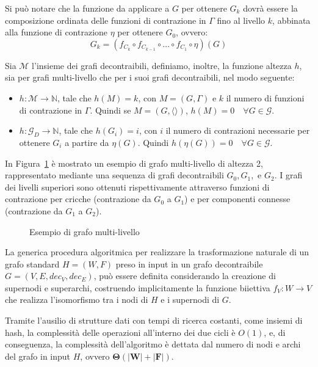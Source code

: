 Si pu\`o notare che la funzione da applicare a $G$ per ottenere $G_{k}$ dovr\`a essere la composizione ordinata
delle funzioni di contrazione in $\Gamma$ fino al livello $k$, abbinata alla funzione di contrazione $\eta$ per
ottenere $G_0$, ovvero:
\begin{equation*}
    G_k = (f_{C_k} \circ f_{C_{k-1}} \circ \ldots \circ f_{C_1} \circ \eta)(G)
\end{equation*}

Sia $\mathcal{M}$ l'insieme dei grafi decontraibili, definiamo, inoltre, la funzione altezza $h$, sia
per grafi multi-livello che per i suoi grafi decontraibili, nel modo seguente:

\begin{itemize}
    \item $h : \mathcal{M} \rightarrow \mathbb{N}$, tale che $h(M) = k$, con $M = (G, \Gamma)$ e $k$ il numero di
    funzioni di contrazione in $\Gamma$. Quindi se $M = (G, \langle \rangle)$, $h(M) = 0 \quad \forall G \in \mathcal{G}$.
    \item $h : \mathcal{G}_D \rightarrow \mathbb{N}$, tale che $h(G_i) = i$, con $i$ il numero di contrazioni
    necessarie per ottenere $G_i$ a partire da $\eta(G)$. Quindi $h(\eta(G)) = 0 \quad \forall G \in \mathcal{G}$.
\end{itemize}

In Figura~\ref{fig:multi-level-graph-example} \`e mostrato un esempio di grafo multi-livello di altezza 2,
rappresentato mediante una sequenza di grafi decontraibili $G_0, G_1,$ e $G_2$. I grafi dei livelli superiori
sono ottenuti rispettivamente attraverso funzioni di contrazione per cricche (contrazione da $G_0$ a $G_1$) e
per componenti connesse (contrazione da $G_1$ a $G_2$).

\begin{figure}
    
    \caption{Esempio di grafo multi-livello}
    \label{fig:multi-level-graph-example}
\end{figure}

\newpage

\label{subsec:algoritmo-di-trasformazione-naturale}

La generica procedura algoritmica per realizzare la trasformazione naturale di un grafo standard $H = (W, F)$
preso in input in un grafo decontraibile $G = (V, E, dec_V, dec_E)$, può essere definita considerando la creazione di
supernodi e superarchi, costruendo implicitamente la funzione biiettiva $f_V: W \rightarrow V$ che realizza
l'isomorfismo tra i nodi di $H$ e i supernodi di $G$.



Tramite l'ausilio di strutture dati con tempi di ricerca costanti, come insiemi di hash, la complessit\`a delle
operazioni all'interno dei due cicli \`e $O(1)$,
e, di conseguenza, la complessit\`a dell'algoritmo \`e dettata dal numero di nodi e archi del grafo in input $H$,
ovvero $\mathbf{\Theta(|W| + |F|)}$.